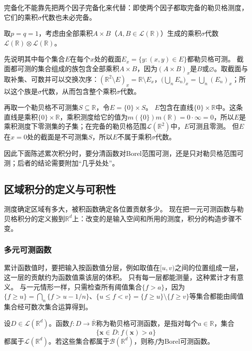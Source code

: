 完备化不能靠先把两个因子完备化来代替：即使两个因子都取完备的勒贝格测度，它们的乘积$\sigma$代数也未必完备。
\begin{example}
\label{ex:region-product-sigma-algebra-incomplete}
取$p=q=1$，考虑由全部乘积$A\times B$（$A,B\in\mathcal L(\mathbb R)$）生成的乘积$\sigma$代数$\mathcal L(\mathbb R)\otimes\mathcal L(\mathbb R)$。

先说明其中每个集合$E$在每个$x$处的截面$E_x=\{y:(x,y)\in E\}$都勒贝格可测。
截面都可测的集合组成的族包含全部乘积$A\times B$，因为$(A\times B)_x$是$B$或$\varnothing$。取截面与取补集、可数并可以交换次序：$(\mathbb R^2\setminus E)_x=\mathbb R\setminus E_x$，$\bigl(\bigcup_nE_n\bigr)_x=\bigcup_n(E_n)_x$；所以这个族是$\sigma$代数，从而包含整个乘积$\sigma$代数。

再取一个勒贝格不可测集$S\subseteq\mathbb R$，令$E=\{0\}\times S$。
$E$包含在直线$\{0\}\times\mathbb R$中。这条直线是乘积$\{0\}\times\mathbb R$，乘积测度给它的值为$m(\{0\})m(\mathbb R)=0\cdot\infty=0$，所以$E$是乘积测度下零测集的子集；在完备的勒贝格范围$\mathcal L(\mathbb R^2)$中，$E$可测且零测。
但$E$在$x=0$处的截面是不可测集$S$，所以$E$不属于乘积$\sigma$代数。
\end{example}

因此下面陈述累次积分时，要分清函数对Borel范围可测，还是只对勒贝格范围可测；后者的结论需要附加“几乎处处”。

\subsection{区域积分的定义与可积性}
\label{sec:multivariable-riemann-lebesgue}

测度确定区域有多大，被积函数确定各位置贡献多少。
现在把一元可测函数与勒贝格积分的定义搬到$\mathbb R^d$上：改变的是输入空间和所用的测度，积分的构造步骤不变。

\subsubsection{多元可测函数}

累计函数值时，要把输入按函数值分层，例如取值在$[u,v)$之间的位置组成一层，这一层的贡献约为函数值乘该层的体积。
只有每一层都能测量，这种累计才有意义。
与一元情形一样，只需检查所有阈值集合$\{f>a\}$，因为$\{f\geq u\}=\bigcap_n\{f>u-1/n\}$、$\{u\leq f<v\}=\{f\geq u\}\setminus\{f\geq v\}$等集合都能由阈值集合经可数次集合运算得到。
\begin{definition}[多元可测函数]
设$D\in\mathcal L(\mathbb R^d)$。函数$f:D\to\overline{\mathbb R}$称为勒贝格可测函数，是指对每个$a\in\mathbb R$，集合
\[
 \{\bm x\in D:f(\bm x)>a\}
\]
都属于$\mathcal L(\mathbb R^d)$。若这些集合都属于$\mathcal B(\mathbb R^d)$，则称$f$为Borel可测函数。
\end{definition}

